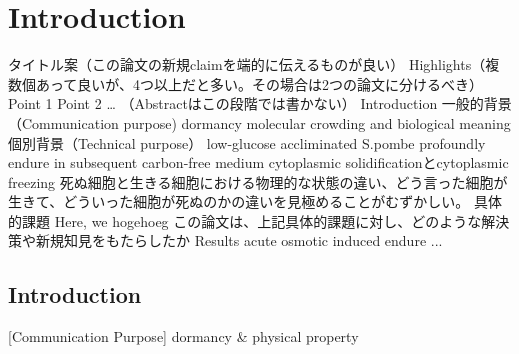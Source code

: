 \chapter{Introduction}
タイトル案（この論文の新規claimを端的に伝えるものが良い）
Highlights（複数個あって良いが、4つ以上だと多い。その場合は2つの論文に分けるべき）
Point 1
Point 2
…
（Abstractはこの段階では書かない）
Introduction
一般的背景（Communication purpose)
dormancy
molecular crowding and biological meaning
個別背景（Technical purpose）
low-glucose accliminated S.pombe profoundly endure in subsequent carbon-free medium
cytoplasmic solidificationとcytoplasmic freezing
死ぬ細胞と生きる細胞における物理的な状態の違い、どう言った細胞が生きて、どういった細胞が死ぬのかの違いを見極めることがむずかしい。
具体的課題
Here, we hogehoeg
この論文は、上記具体的課題に対し、どのような解決策や新規知見をもたらしたか
Results
acute
osmotic induced endure
... 

\section{Introduction}
[Communication Purpose] 
dormancy \& physical property

